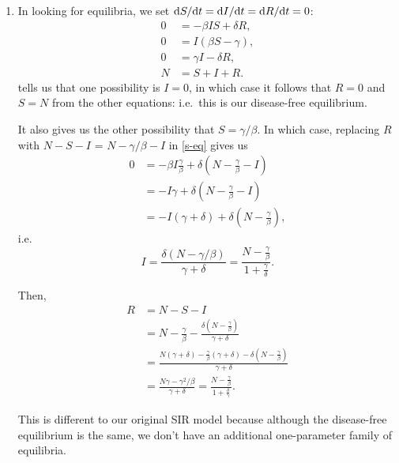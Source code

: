 \documentclass[a4paper,12pt]{article}
\begin{document}
\begin{enumerate}[label={\bf \arabic{*}.\;}, ref={\arabic{*}},itemsep=3ex, left=0ex]
{\begin{enumerate}[label=(\alph*)]
        \item In looking for equilibria, we set $\fd{S}{t} = \fd{I}{t} = \fd{R}{t} = 0$:
          \begin{align}
            0 &= - \beta I S + \delta R, \label{s-eq} \\
            0 &= I (\beta S - \gamma), \label{i-eq}\\
            0 &= \gamma I - \delta R, \\
            N &= S + I + R.
          \end{align}
           tells us that one possibility is $I=0$, in which case it follows that $R=0$ and $S=N$ from the other equations: i.e.\ this is our disease-free equilibrium.

          It also gives us the other possibility that $S = \gamma/\beta$. In which case, replacing $R$ with $N - S - I$ = $N -\gamma/\beta - I$ in \cref{s-eq} gives us
          \begin{align}
            0 &= -\beta I \frac{\gamma}{\beta} + \delta\left(N-\frac{\gamma}{\beta} - I\right)\\
            &= -I\gamma + \delta\left(N-\frac{\gamma}{\beta} - I\right) \\
            &= -I(\gamma+\delta) + \delta\left(N-\frac{\gamma}{\beta}\right),
          \end{align}
          i.e.\
          \begin{equation}
            I = \frac{\delta(N-\gamma/\beta)}{\gamma+\delta} = \frac{N-\frac{\gamma}{\beta}}{1 + \frac{\gamma}{\delta}}.
          \end{equation}

          Then,
          \begin{align}
            R &= N - S - I \\
            &= N - \frac{\gamma}{\beta} - \frac{\delta(N - \frac{\gamma}{\beta})}{\gamma+\delta} \\
            &= \frac{N(\gamma+\delta)-\frac{\gamma}{\beta}(\gamma+\delta)-\delta(N-\frac{\gamma}{\beta})}{\gamma+\delta} \\
            &= \frac{N\gamma - \gamma^2/\beta}{\gamma+\delta} = \frac{N-\frac{\gamma}{\beta}}{1 + \frac{\delta}{\gamma}}.
          \end{align}

          This is different to our original SIR model because although the disease-free equilibrium is the same, we don't have an additional one-parameter family of equilibria.


\end{enumerate}}
\end{enumerate}
\end{document}
